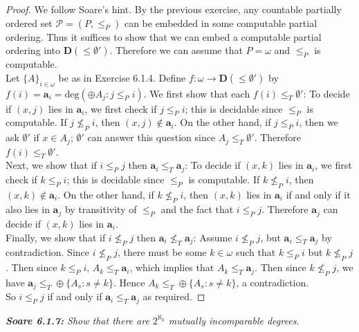 \documentclass{article}
\begin{document}
  \begin{proof}
    We follow Soare's hint. By the previous exercise, any countable
    partially ordered set $\mathcal{P}=(P,\leq_P)$ can be embedded in some
    computable partial ordering. Thus it suffices to show that we can embed
    a computable partial ordering into $\bm{D}(\leq\emptyset')$.
    Therefore we can assume that $P=\omega$ and $\leq_P$ is computable. \\

    Let $\{A\}_{i\in\omega}$ be as in Exercise 6.1.4. Define
    $f:\omega\rightarrow \bm{D}(\leq\emptyset')$ by
    $f(i)=\bm{a}_i=\text{deg}(\oplus A_j:j\leq_P i)$. We first show that
    each $f(i)\leq_T\emptyset'$: To decide if $(x,j)$ lies in $\bm{a}_i$,
    we first check if $j\leq_P i$; this is decidable since $\leq_P$ is
    computable. If $j\not\leq_P i$, then $(x,j)\not\in\bm{a}_i$. On the
    other hand, if $j\leq_P i$, then we ask $\emptyset'$ if $x\in A_j$;
    $\emptyset'$ can answer this question since $A_j\leq_T\emptyset'$.
    Therefore $f(i)\leq_T\emptyset'$. \\

    Next, we show that if $i\leq_P j$ then $\bm{a}_i\leq_T\bm{a}_j$: To
    decide if $(x,k)$ lies in $\bm{a}_i$, we first check if $k\leq_P i$;
    this is decidable since $\leq_P$ is computable. If $k\not\leq_P i$,
    then $(x,k)\not\in\bm{a}_i$. On the other hand, if $k\not\leq_P i$,
    then $(x,k)$ lies in $\bm{a}_i$ if and only if it also lies in
    $\bm{a}_j$ by transitivity of $\leq_P$ and the fact that $i\leq_P j$.
    Therefore $\bm{a}_j$ can decide if $(x,k)$ lies in $\bm{a}_i$. \\

    Finally, we show that if $i\not\leq_P j$ then
    $\bm{a}_i\not\leq_T\bm{a}_j$: Assume $i\not\leq_P j$, but
    $\bm{a}_i\leq_T\bm{a}_j$ by contradiction. Since $i\not\leq_P j$, there
    must be some $k\in\omega$ such that $k\leq_P i$ but $k\not\leq_P j$.
    Then since $k\leq_P i$, $A_k\leq_T\bm{a}_i$, which implies that
    $A_k\leq_T\bm{a}_j$. Then since $k\not\leq_P j$, we have $\bm{a}_j\leq_T
    \oplus\{A_s:s\neq k\}$. Hence $A_k\leq_T \oplus\{A_s:s\neq k\}$,
    a contradiction. \\

    So $i\leq_P j$ if and only if $\bm{a}_i\leq_T\bm{a}_j$ as required.
  \end{proof}

\it \textbf{Soare 6.1.7:} Show that there are $2^{\aleph_0}$ mutually
  incomparable degrees.
\end{document}
